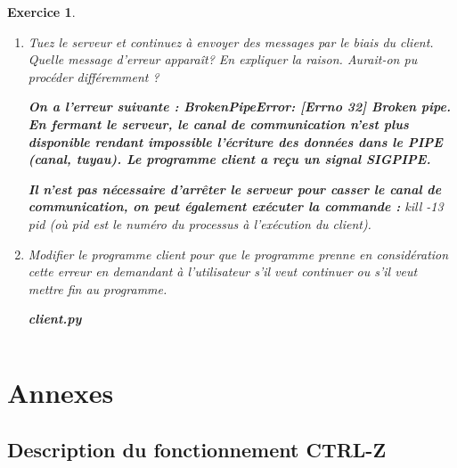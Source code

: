 \documentclass[10pt,french,A4]{article}
\theoremstyle{plain}
\newtheorem{exercice}{Exercice}
\newenvironment{code}[1]{%
    \begin{bclogo}[couleur=backcolour, couleurTexte=black ,couleurBord=blue ,couleurBarre=black, ombre=false,epBord=0.9,logo=\#,arrondi=0.1]{{\bfseries #1}}%
    }%
    {%
    \end{bclogo}
}%
\begin{document}
\begin{exercice}
\begin{enumerate}
\begin{enumerate}
              \ifProf
           \textbf{Le parent est un programme \textit{bash}, donc en utilisant les informations de  \textit{htop} on voit qu'il peut s'agir du pid 11806 ou 11792}
           \fi
           \item Comment mettre fin au  processus associé serveur.py ? (donnez deux possibilités)
            
             \ifProf
           \textbf{En tapant Ctrl-C, avec  la fenêtre du terminal correspondant actif, en cliquant sur la croix de la fenêtre appropriée ou en tapant dans une console kill -2 11812.}
           \fi
       \end{enumerate}
        \item Tuez le serveur et continuez à envoyer des messages par le biais du client. Quelle message d'erreur apparaît? En expliquer la raison.
        Aurait-on pu procéder différemment ?
        
         \ifProf
        \textbf{On a l'erreur suivante : BrokenPipeError: [Errno 32] Broken pipe.\\ En fermant le serveur, le canal de communication n'est plus disponible rendant impossible l'écriture des données dans le PIPE (canal, tuyau). Le programme client a reçu un signal SIGPIPE.}
        
         \textbf{Il n'est pas nécessaire d'arrêter le serveur pour casser le canal de communication, on peut également exécuter la commande : } 
 kill -13 pid  (où pid est le numéro du processus à l'exécution du client).

        \fi
        
        \item Modifier le programme client pour que le programme prenne en considération cette erreur en demandant à l'utilisateur s'il veut continuer ou s'il veut mettre fin au programme.
        
        \ifProf
   
        \begin{code}{client.py}
            \inputminted[fontsize=\small]{Python}{client.py}
        \end{code}
        \fi
    \end{enumerate}
    
\end{exercice}
\newpage
\section{Annexes}

\subsection{Description du fonctionnement CTRL-Z}
\end{document}
